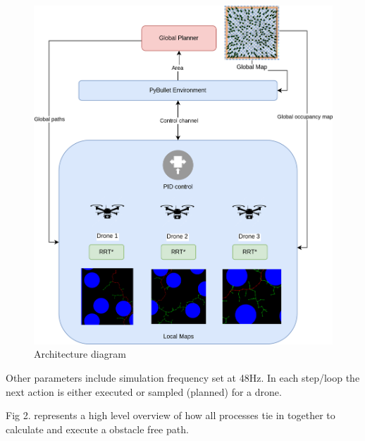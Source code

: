 \begin{figure}[h]
\centering
\includegraphics[scale=0.15]{images/arch_diag.png}
\caption{Architecture diagram}
\end{figure}

Other parameters include simulation frequency set at 48Hz. In each step/loop the next action is either executed or sampled (planned) for a drone.

Fig 2. represents a high level overview of how all processes tie in together to calculate and execute a obstacle free path.

